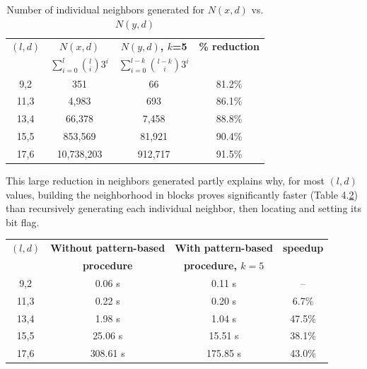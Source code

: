 \documentclass[oneside,12pt]{DISCSthesis}
\begin{document}
{	\begin{table}[h] %
		\small
		\renewcommand{\arraystretch}{1.3}
		\label{tbl:neighbors_blockmasking}
		\centering
		\begin{tabular}{|c|c|c|c|}
		\hline 
		\bfseries\boldmath $(l,d)$ & \bfseries\boldmath $N(x,d)$ & \bfseries\boldmath $N(y,d)$, $k$=5 & \bfseries \% reduction\\
		\bfseries & \bfseries\boldmath $\sum_{i=0}^{l} \binom{l}{i} 3^{i}$ & \bfseries\boldmath $\sum_{i=0}^{l-k} \binom{l-k}{i} 3^{i}$ & \\
		\hline
		 9,2 &         351  &       66 & 81.2\%\\
		11,3 &       4,983  &      693 & 86.1\%\\
		13,4 &      66,378  &    7,458 & 88.8\%\\
		15,5 &     853,569  &   81,921 & 90.4\%\\
		17,6 &  10,738,203  &  912,717 & 91.5\%\\
		\hline\end{tabular}

		\caption{\small Number of individual neighbors generated for $N(x,d)$ vs. $N(y,d)$}
		\end{table}


		\noindent This large reduction in neighbors generated partly explains why, for most $(l,d)$ values, building the neighborhood in blocks proves significantly faster (Table 4.\ref{tbl:speedup_blockmasking}) than recursively generating each individual neighbor, then locating and setting its bit flag. \newline

			\begin{table}[h] %
				\small
				\renewcommand{\arraystretch}{1.3}
				\label{tbl:speedup_blockmasking}
				\centering
				\begin{tabular}{|c|c|c|c|}
				\hline 
				\bfseries\boldmath $(l,d)$ & \bfseries Without pattern-based & \bfseries With pattern-based & \bfseries speedup\\
				\bfseries & \bfseries procedure & \bfseries\boldmath procedure, $k=5$ & \bfseries\\
				\hline
				 9,2 &   0.06 s &    0.11 s &     --  \\
				11,3 &   0.22 s &    0.20 s &    6.7\%\\
				13,4 &   1.98 s &    1.04 s &   47.5\%\\
				15,5 &  25.06 s &   15.51 s &   38.1\%\\
				17,6 & 308.61 s &  175.85 s &   43.0\%\\
				\hline\end{tabular}


\end{table}}
\end{document}
